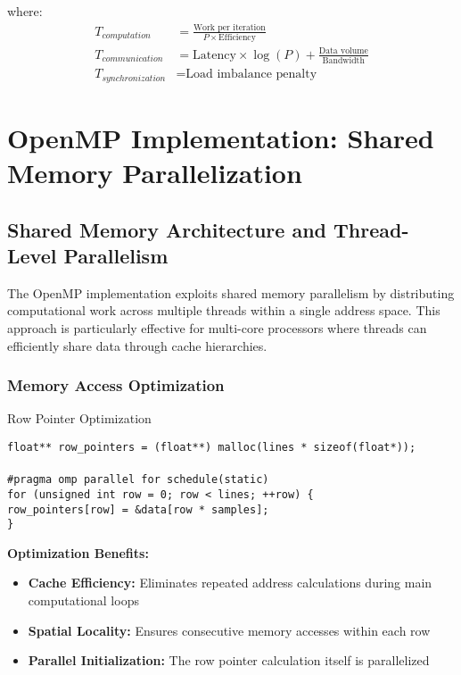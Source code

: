 \documentclass[12pt,a4paper]{article}
\begin{document}
where:
\begin{align}
T_{computation} &= \frac{\text{Work per iteration}}{P \times \text{Efficiency}} \\
T_{communication} &= \text{Latency} \times \log(P) + \frac{\text{Data volume}}{\text{Bandwidth}} \\
T_{synchronization} &= \text{Load imbalance penalty}
\end{align}

\section{OpenMP Implementation: Shared Memory Parallelization}

\subsection{Shared Memory Architecture and Thread-Level Parallelism}

The OpenMP implementation exploits shared memory parallelism by distributing computational work across multiple threads within a single address space. This approach is particularly effective for multi-core processors where threads can efficiently share data through cache hierarchies.

\subsubsection{Memory Access Optimization}

\begin{algorithm}[H]
\caption{Row Pointer Optimization}
\label{alg:omp_rowpointers}
\begin{flushleft}
\texttt{float** row\_pointers = (float**) malloc(lines * sizeof(float*));}\\
\\
\texttt{\#pragma omp parallel for schedule(static)}\\
\texttt{for (unsigned int row = 0; row < lines; ++row) \{}\\
\hspace{1cm}\texttt{row\_pointers[row] = \&data[row * samples];}\\
\texttt{\}}
\end{flushleft}
\end{algorithm}

\textbf{Optimization Benefits:}
\begin{itemize}
\item \textbf{Cache Efficiency:} Eliminates repeated address calculations during main computational loops
\item \textbf{Spatial Locality:} Ensures consecutive memory accesses within each row
\item \textbf{Parallel Initialization:} The row pointer calculation itself is parallelized
\end{itemize}
\end{document}

